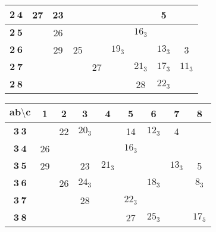 \documentclass[a4paper,12pt]{report}
\begin{document}
\begin{center}
\begin{tabular}{|c||c|c|c|c|c|c|c|c|}
$\textbf{2}\:\textbf{4}$ & 27 & 23 & & & & \hspace{6mm} & 5 &\\ \hline

$\textbf{2}\:\textbf{5}$ & \hspace{6mm} & 26 & & & & $16_{3}$ & & \\ \hline

$\textbf{2}\:\textbf{6}$ &  & 29 & 25 & & $19_{3}$ & & $13_{3}$ & 3 \\ \hline

$\textbf{2}\:\textbf{7}$ &  &  & & 27 & & $21_{3}$ & $17_{3}$ & $11_{3}$ \\ \hline

$\textbf{2}\:\textbf{8}$ &  &  & & & & 28 & $22_{3}$ & \\ \hline
\end{tabular}

\begin{tabular}{|c||c|c|c|c|c|c|c|c|}\hline
$\textbf{ab} \setminus \textbf{c}$  & \textbf{1} & \textbf{2} & \textbf{3} & \textbf{4} & \textbf{5} & \textbf{6} & \textbf{7}& \textbf{8} \\
\hline \hline

$\textbf{3}\:\textbf{3}$ & \hspace{6mm}  & 22  & $20_{3}$ & \hspace{6mm} & 14 & $12_{3}$ & 4 & \hspace{6mm}  \\
\hline

$\textbf{3}\:\textbf{4}$ & 26 & \hspace{6mm} & \hspace{6mm} &  & $16_{3}$ & \hspace{6mm} & \hspace{6mm} & \\
\hline

$\textbf{3}\:\textbf{5}$ & 29 &  & 23 & $21_{3}$ & \hspace{6mm} & & $13_{3}$ & 5 \\
\hline

$\textbf{3}\:\textbf{6}$ &  & 26 & $24_{3}$ &  &  & $18_{3}$ &  & $8_{3}$ \\
\hline

$\textbf{3}\:\textbf{7}$ &  &  & 28 &  & $22_{3}$ & & & \\ \hline

$\textbf{3}\:\textbf{8}$ &  &  &  &  & 27 & $25_{3}$ & & $17_{5}$ \\ \hline
\end{tabular}


\end{center}
\end{document}

